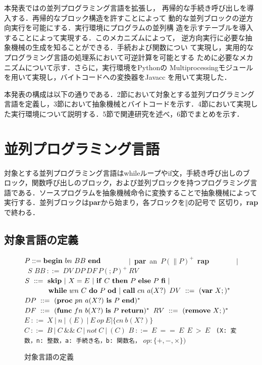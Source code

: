 \documentclass[submit,PRO]{ipsj}
\def\|{\verb|}
\begin{document}
本発表では\cite{DBLP:conf/rc/IkedaY20}の並列プログラミング言語を拡張し，
再帰的な手続き呼び出しを導入する．再帰的なブロック構造を許すことによって
動的な並列ブロックの逆方向実行を可能にする．実行環境にプログラムの並列構
造を示すテーブルを導入することによって実現する．このメカニズムによって，
逆方向実行に必要な抽象機械の生成を知ることができる．手続および関数につい
て実現し，実用的なプログラミング言語の処理系において可逆計算を可能とする
ために必要なメカニズムについて示す．さらに，実行環境をPythonの
Multiprocessingモジュールを用いて実現し，バイトコードへの変換器をJavacc
を用いて実現した．

本発表の構成は以下の通りである．2節において対象とする並列プログラミング
言語を定義し，3節において抽象機械とバイトコードを示す．4節において実現し
た実行環境について説明する．5節で関連研究を述べ，6節でまとめを示す．

%3
\section{並列プログラミング言語}

対象とする並列プログラミング言語はwhileループやif文，手続き呼び出しのブ
ロック，関数呼び出しのブロック，および並列ブロックを持つプログラミング言
語である．ソースプログラムを抽象機械命令に変換することで抽象機械によって
実行する．並列ブロックは{\bf par}から始まり，各ブロックを$\Vert$の記号で
区切り，{\bf rap}で終わる．

%3.1
\subsection{対象言語の定義}
\label{sec:3.1}

\begin{figure}[tb]
\vbox{
\hbox{$P ::= {\bf begin}\ bn\ BB\ {\bf end}$}
\hbox{\ \ \ \ \ \ \ $\vert$ {\bf par} an $P(\parallel P)^+$ {\bf rap}}
\hbox{\ \ \ \ \ \ \ $\vert$ $S$}
\hbox{$BB\ ::=\ DV\ DP\ DF\ P(;P)^+\ RV$}
\hbox{$S\ ::=\ {\bf skip}\ \vert\  X = E\ \vert\ {\bf if}\ C\ {\bf then}\ P\ {\bf else}\ P\ {\bf fi}\ \vert$}
\hbox{$\ \ \ \ \ \ \ \ \ \  {\bf while}\ wn\ C\ {\bf do}\ P\ {\bf od}\ \vert\ {\bf call}\ cn\ a(X?)$}
\hbox{$DV\ ::=\ ({\bf var}\ X;)^*$}
\hbox{$DP\ ::=\ ({\bf proc}\ pn\ a(X?)\ {\bf is}\ P\ {\bf end})^*$}
\hbox{$DF\ ::=\ ({\bf func}\ fn\ b(X?)\ {\bf is}\ P\ {\bf return})^*$}
\hbox{$RV\ ::=\ ({\bf remove}\ X;)^*$}
\hbox{$E\ ::=\ X\ \vert\ n\ \vert\ (E)\ \vert\ E\ op\ E \vert \{cn\ b(X?)\}$}
\hbox{$C\ ::=\ B\ \vert\ C\ \&\& \ C\ \vert\ not\ C\ \vert\ (C)$}
\hbox{$B\ ::=\ E\ ==\ E\ \ E\ >\ E$}
\hbox{\\}
\hbox{\| (X: 変数，n: 整数，a: 手続き名，b: 関数名，|}
\hbox{$op: \{+,-,\times \})$}
}
\centerline{}
\caption{対象言語の定義}
\label{fig:def}
\end{figure}
\end{document}
